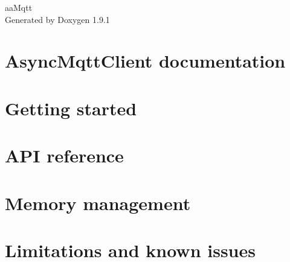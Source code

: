 \let\mypdfximage\pdfximage\def\pdfximage{\immediate\mypdfximage}\documentclass[twoside]{book}
\newcommand{\+}{\discretionary{\mbox{\scriptsize$\hookleftarrow$}}{}{}}
\newcommand{\clearemptydoublepage}{%
  \newpage{\pagestyle{empty}\cleardoublepage}%
}
\begin{document}
\raggedbottom

\hypersetup{pageanchor=false,
             bookmarksnumbered=true,
             pdfencoding=unicode
            }
\begin{titlepage}
\vspace*{7cm}
\begin{center}%
{\Large aa\+Mqtt }\\
\vspace*{1cm}
{\large Generated by Doxygen 1.9.1}\\
\end{center}
\end{titlepage}
\clearemptydoublepage
{}
\tableofcontents
\clearemptydoublepage
{}
\hypersetup{pageanchor=true}

\chapter{Async\+Mqtt\+Client documentation}
\label{index}\hypertarget{index}{}
\chapter{Getting started}
\label{md_lib_async_mqtt_client_master_docs_1___getting_started}

\chapter{API reference}
\label{md_lib_async_mqtt_client_master_docs_2___a_p_i_reference}

\chapter{Memory management}
\label{md_lib_async_mqtt_client_master_docs_3___memory_management}

\chapter{Limitations and known issues}
\label{md_lib_async_mqtt_client_master_docs_4___limitations_and_known_issues}

\end{document}
